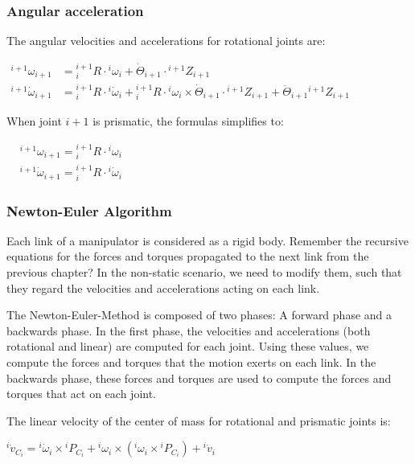 \subsubsection{Angular acceleration}
The angular velocities and accelerations for rotational joints are:
\begin{center}
$\begin{aligned}
{ }^{i+1} \omega_{i+1} &={ }_{i}^{i+1} R \cdot{ }^{i} \omega_{i}+\dot{\Theta}_{i+1} \cdot{ }^{i+1} Z_{i+1} \\
{ }^{i+1} \dot{\omega}_{i+1} &={ }_{i}^{i+1} R \cdot{ }^{i} \dot{\omega}_{i}+{ }_{i}^{i+1} R \cdot{ }^{i} \omega_{i} \times \dot{\Theta}_{i+1} \cdot{ }^{i+1} Z_{i+1}+\ddot{\Theta}_{i+1}{ }^{i+1} Z_{i+1}
\end{aligned}$
\end{center}

When joint $i+1$ is prismatic, the formulas simplifies to:

\begin{center}
$\begin{aligned}
&{ }^{i+1} \omega_{i+1}={ }_{i}^{i+1} R \cdot{ }^{i} \omega_{i}\\
&{ }^{i+1} \dot{\omega}_{i+1}={ }_{i}^{i+1} R \cdot{ }^{i} \dot{\omega}_{i}
\end{aligned}$
\end{center}

\subsubsection{Newton-Euler Algorithm}
Each link of a manipulator is considered as a rigid body. Remember the recursive equations for the forces and torques propagated to the next link from the previous chapter? In the non-static scenario, we need to modify them, such that they regard the velocities and accelerations acting on each link.

The Newton-Euler-Method is composed of two phases: A forward phase and a backwards phase. In the first phase, the velocities and accelerations (both rotational and linear) are computed for each joint. Using these values, we compute the forces and torques that the motion exerts on each link. In the backwards phase, these forces and torques are used to compute the forces and torques that act on each joint.

 The linear velocity of the center of mass for rotational and prismatic joints is:

\begin{center}
	${ }^{i} \dot{v}_{C_{i}}={ }^{i} \dot{\omega}_{i} \times{ }^{i} P_{C_{i}}+{ }^{i} \omega_{i} \times\left({ }^{i} \omega_{i} \times{ }^{i} P_{C_{i}}\right)+{ }^{i} \dot{v}_{i}$
\end{center}

